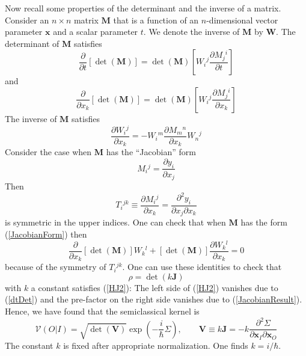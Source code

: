 Now recall some properties of the determinant and the inverse of a matrix. Consider an $n \times n$ matrix $\mathbf{M}$ that is a function of an $n$-dimensional vector parameter $\mathbf{x}$ and a scalar parameter $t$. We denote the inverse of $\mathbf{M}$ by $\mathbf{W}$. The determinant of $\mathbf{M}$ satisfies
\begin{equation}
	\frac{\partial}{\partial t} [ \det{(\mathbf{M})} ] = \det{(\mathbf{M})} \left[ W_{i}{}^{j} \frac{\partial M_{j}{}^{i}}{\partial t} \right] \label{dtDet}
\end{equation}
and
\begin{equation}
	\frac{\partial}{\partial x_{k}} [ \det{(\mathbf{M})} ] = \det{(\mathbf{M})} \left[ W_{i}{}^{j} \frac{\partial M_{j}{}^{i}}{\partial x_{k}} \right] \label{dxDet}
\end{equation}
The inverse of $\mathbf{M}$ satisfies
\begin{equation}
	\frac{\partial W_{i}{}^{j}}{\partial x_{k}} = - W_{i}{}^{m} \frac{\partial M_{m}{}^{n}}{\partial x_{k}} W_{n}{}^{j}
\end{equation}
Consider the case when $\mathbf{M}$ has the ``Jacobian'' form
\begin{equation}
	M_{i}{}^{j} = \frac{\partial y_{i}}{\partial x_{j}} \label{JacobianForm}
\end{equation}
Then
\begin{equation}
	T_{i}{}^{jk} \equiv \frac{\partial M_{i}{}^{j}}{\partial x_{k}} = \frac{\partial^{2} y_{i}}{\partial x_{j} \partial x_{k}}
\end{equation}
is symmetric in the upper indices. One can check that when $\mathbf{M}$ has the form (\ref{JacobianForm}) then
\begin{equation}
	\frac{\partial}{\partial x_{k}} [ \det{(\mathbf{M})} ] W_{k}{}^{l} + [ \det{(\mathbf{M})} ] \frac{\partial W_{k}{}^{l}}{\partial x_{k}} = 0 \label{JacobianResult}
\end{equation}
because of the symmetry of $T_{i}{}^{jk}$. One can use these identities to check that
\begin{equation}
	\rho = \det{(k \mathbf{J})}
\end{equation}
with $k$ a constant satisfies (\ref{HJ2}): The left side of (\ref{HJ2}) vanishes due to (\ref{dtDet}) and the pre-factor on the right side vanishes due to (\ref{JacobianResult}). Hence, we have found that the semiclassical kernel is
\begin{equation}
	\mathcal{V}(O|I) = \sqrt{\det{(\mathbf{V})}} \exp{\left(- \frac{i}{\hbar} \Sigma \right)}, \qquad \mathbf{V} \equiv k \mathbf{J} = - k \frac{\partial^{2} \Sigma }{\partial \mathbf{x}_{I} \partial \mathbf{x}_{O}}
\end{equation}
The constant $k$ is fixed after appropriate normalization. One finds $k = i / \hbar$.

